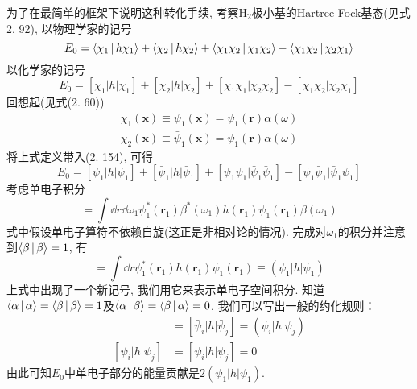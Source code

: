为了在最简单的框架下说明这种转化手续, 
考察$\mathrm{H}_2$极小基的Hartree-Fock基态(见式2.
92), 
以物理学家的记号
\begin{equation}
E_0 = \Braket{\chi_1|h\chi_1} + \Braket{\chi_2|h\chi_2} + \Braket{\chi_1\chi_2|\chi_1\chi_2} - \Braket{\chi_1\chi_2|\chi_2\chi_1}
\end{equation}
以化学家的记号
\begin{equation}
E_0 = [{\chi_1|h|\chi_1}] + [{\chi_2|h|\chi_2}] + [{\chi_1\chi_1|\chi_2\chi_2}] - [{\chi_1\chi_2|\chi_2\chi_1}]
\end{equation}
回想起(见式(2.
60))
\begin{align}
\chi_1(\mathbf{x})\equiv \psi_1(\mathbf{x}) = \psi_1(\mathbf{\mathbf{r}})\alpha(\omega)\\
\chi_2(\mathbf{x})\equiv \bar{\psi}_1(\mathbf{x}) = \psi_1(\mathbf{\mathbf{r}})\alpha(\omega)
\end{align}
将上式定义带入(2.
154), 
可得
\begin{equation}
E_0 = [{\psi_1|h|\psi_1}] + [{\bar{\psi}_1|h|\bar{\psi}_1}] + [{\psi_1\psi_1|\bar{\psi}_1\bar{\psi}_1}] - [{\psi_1\bar{\psi}_1|\bar{\psi}_1\psi_1}]
\end{equation}
考虑单电子积分
\begin{equation}
[\bar{\psi}_1|h|\bar{\psi}_1] = \int\dd{r}\dd\omega_1\psi_1^*(\mathbf{r}_1)\beta^*(\omega_1)h(\mathbf{r}_1)\psi_1(\mathbf{r}_1)\beta(\omega_1)
\end{equation}
式中假设单电子算符不依赖自旋(这正是非相对论\ha 的情况). 
完成对$\omega_1$的积分并注意到$\Braket{\beta|\beta}=1$, 
有
\begin{equation}
[\bar{\psi}_1|h|\bar{\psi}_1] =\int\dd{r}\psi_1^*(\mathbf{r}_1)h(\mathbf{r}_1)\psi_1(\mathbf{r}_1) \equiv (\psi_1|h|\psi_1)
\end{equation}
上式中出现了一个新记号, 
我们用它来表示单电子空间积分. 
知道$\Braket{\alpha|\alpha}=\Braket{\beta|\beta}=1$及$\Braket{\alpha|\beta}=\Braket{\beta|\alpha}=0$, 
我们可以写出一般的约化规则：
\begin{align}
[{\psi}_i|h|{\psi}_j] & = [\bar{\psi}_i|h|\bar{\psi}_j] = (\psi_i|h|\psi_j)\\
[{\psi}_i|h|\bar{\psi}_j] & = [\bar{\psi}_i|h|\psi_j] = 0 
\end{align}
由此可知$E_0$中单电子部分的能量贡献是$2(\psi_1|h|\psi_1)$.


